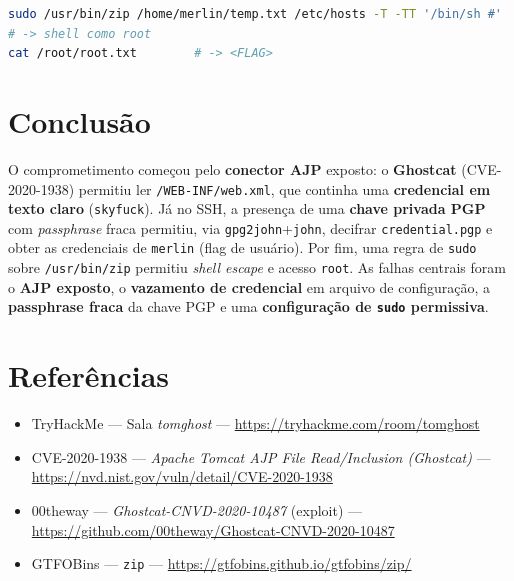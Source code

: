 \documentclass[12pt,a4paper]{article}
\begin{document}
\begin{lstlisting}[language=bash,caption={Escalada a root pelo zip.}]
sudo /usr/bin/zip /home/merlin/temp.txt /etc/hosts -T -TT '/bin/sh #'
# -> shell como root
cat /root/root.txt        # -> <FLAG>
\end{lstlisting}

\section{Conclusão}
O comprometimento começou pelo \textbf{conector AJP} exposto: o \textbf{Ghostcat}
(CVE-2020-1938) permitiu ler \texttt{/WEB-INF/web.xml}, que continha uma
\textbf{credencial em texto claro} (\texttt{skyfuck}). Já no SSH, a presença de
uma \textbf{chave privada PGP} com \emph{passphrase} fraca permitiu, via
\texttt{gpg2john}+\texttt{john}, decifrar \texttt{credential.pgp} e obter as
credenciais de \texttt{merlin} (flag de usuário). Por fim, uma regra de
\texttt{sudo} sobre \texttt{/usr/bin/zip} permitiu \emph{shell escape} e acesso
\texttt{root}. As falhas centrais foram o \textbf{AJP exposto}, o
\textbf{vazamento de credencial} em arquivo de configuração, a \textbf{passphrase
fraca} da chave PGP e uma \textbf{configuração de \texttt{sudo} permissiva}.

\section{Referências}
\begin{itemize}[leftmargin=1.5em]
  \item TryHackMe --- Sala \emph{tomghost} ---
        \url{https://tryhackme.com/room/tomghost}
  \item CVE-2020-1938 --- \emph{Apache Tomcat AJP File Read/Inclusion (Ghostcat)} ---
        \url{https://nvd.nist.gov/vuln/detail/CVE-2020-1938}
  \item 00theway --- \emph{Ghostcat-CNVD-2020-10487} (exploit) ---
        \url{https://github.com/00theway/Ghostcat-CNVD-2020-10487}
  \item GTFOBins --- \texttt{zip} ---
        \url{https://gtfobins.github.io/gtfobins/zip/}
\end{itemize}
\end{document}
